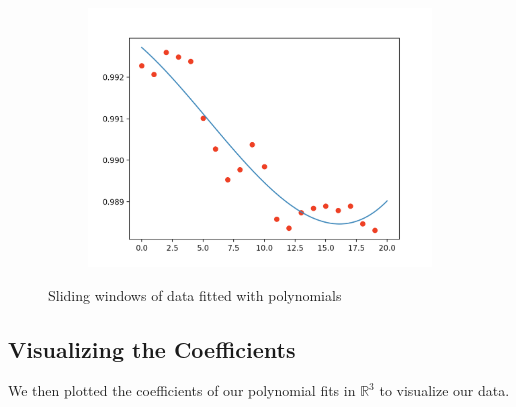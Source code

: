 \documentclass[final]{article}
\begin{document}
\begin{figure}[H]
\begin{subfigure}{.3\textwidth}
    \includegraphics[width=\linewidth]{img/sliding3}
  \end{subfigure}
  \caption{Sliding windows of data fitted with polynomials}
  \label{fig:sliding}
\end{figure}

\subsection{Visualizing the Coefficients}

We then plotted the coefficients of our polynomial fits in $\mathbb{R}^3$
to visualize our data.
\end{document}
